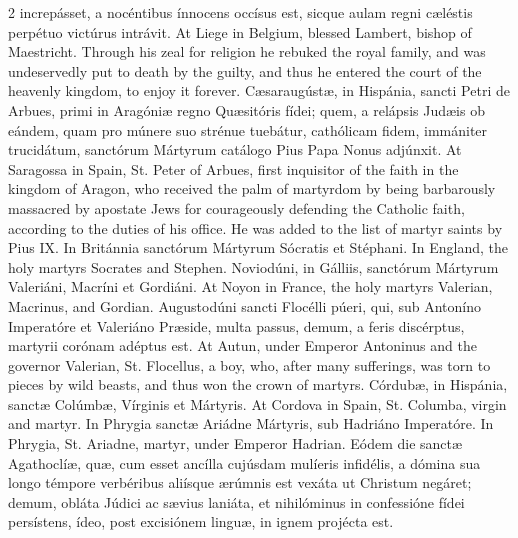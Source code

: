 \begin{paracol}{2}
 increpásset, a nocéntibus ínnocens occísus est, sicque aulam regni cæléstis 
 perpétuo victúrus intrávit.
\switchcolumn
{}
At Liege in Belgium, blessed 
 Lambert, bishop of Maestricht. Through his zeal for religion he 
 rebuked the royal family, and was undeservedly put to death by the guilty, 
 and thus he entered the court of the heavenly kingdom, to enjoy it forever.
\switchcolumn*
{}
Cæsaraugústæ, in 
 Hispánia, sancti Petri de Arbues, primi in Aragóniæ regno Quæsitóris fídei; 
 quem, a relápsis Judæis ob eándem, quam pro múnere suo strénue tuebátur, 
 cathólicam fidem, immániter trucidátum, sanctórum Mártyrum catálogo Pius 
 Papa Nonus adjúnxit.
\switchcolumn
{}
At Saragossa in Spain, St. Peter of 
 Arbues, first inquisitor of the faith in the kingdom of Aragon, who received 
 the palm of martyrdom by being barbarously massacred by apostate Jews for 
 courageously defending the Catholic faith, according to the duties of his 
 office. He was added to the list of martyr saints by Pius IX.
\switchcolumn*
{}
In Británnia sanctórum 
 Mártyrum Sócratis et Stéphani.
\switchcolumn
{}
In England, the holy martyrs 
 Socrates and Stephen.
\switchcolumn*
{}
Noviodúni, in Gálliis, 
 sanctórum Mártyrum Valeriáni, Macríni et Gordiáni.
\switchcolumn
{}
At Noyon in France, the holy martyrs 
 Valerian, Macrinus, and Gordian.
\switchcolumn*
{}
Augustodúni sancti 
 Flocélli púeri, qui, sub Antoníno Imperatóre et Valeriáno Præside, multa 
 passus, demum, a feris discérptus, martyrii corónam adéptus est.
\switchcolumn
{}
At Autun, under Emperor Antoninus 
 and the governor Valerian, St. Flocellus, a boy, who, after many sufferings, 
 was torn to pieces by wild beasts, and thus won the crown of martyrs.
\switchcolumn*
{}
Córdubæ, in Hispánia, 
 sanctæ Colúmbæ, Vírginis et Mártyris.
\switchcolumn
{}
At Cordova in Spain, St. Columba, 
 virgin and martyr.
\switchcolumn*
{}
In Phrygia sanctæ 
 Ariádne Mártyris, sub Hadriáno Imperatóre.
\switchcolumn
{}
In Phrygia, St. Ariadne, martyr, 
 under Emperor Hadrian.
\switchcolumn*
{}
Eódem die sanctæ 
 Agathoclíæ, quæ, cum esset ancílla cujúsdam mulíeris infidélis, a dómina sua 
 longo témpore verbéribus aliísque ærúmnis est vexáta ut Christum negáret; 
 demum, obláta Júdici ac sævius laniáta, et nihilóminus in confessióne fídei 
 persístens, ídeo, post excisiónem linguæ, in ignem projécta est.

\end{paracol}
